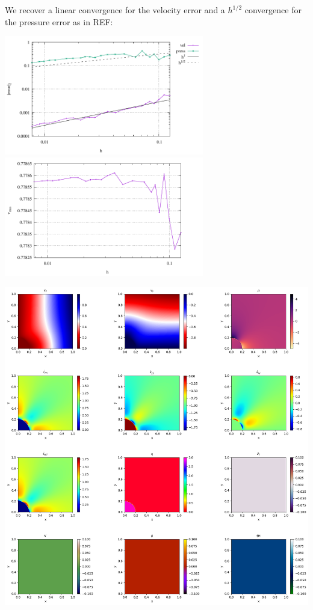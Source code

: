 \documentclass[a4paper]{article}
\begin{document}
We recover a linear convergence for the velocity error and a $h^{1/2}$
convergence for the pressure error as in REF:
\begin{center}
\includegraphics[width=8.7cm]{./results/benchmark_solvi/convergence.pdf}
\includegraphics[width=8.7cm]{./results/benchmark_solvi/vrms.pdf}
\end{center}

\newpage
\begin{center}
\includegraphics[width=14cm]{./results/benchmark_solvi/img_solution_0000.png}
\end{center}
\end{document}
